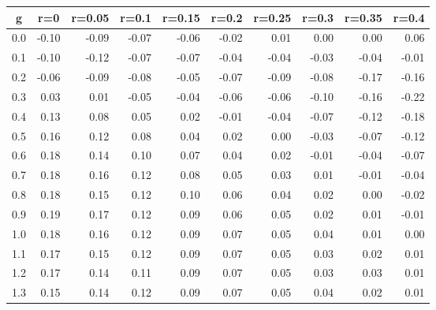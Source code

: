 %
\begin{table}[!tbp]
 \begin{center}
 \begin{tabular}{rrrrrrrrrr}\hline\hline
\multicolumn{1}{c}{g}&\multicolumn{1}{c}{r=0}&\multicolumn{1}{c}{r=0.05}&\multicolumn{1}{c}{r=0.1}&\multicolumn{1}{c}{r=0.15}&\multicolumn{1}{c}{r=0.2}&\multicolumn{1}{c}{r=0.25}&\multicolumn{1}{c}{r=0.3}&\multicolumn{1}{c}{r=0.35}&\multicolumn{1}{c}{r=0.4}\tabularnewline
\hline
0.0&-0.10&-0.09&-0.07&-0.06&-0.02& 0.01& 0.00& 0.00& 0.06\tabularnewline
0.1&-0.10&-0.12&-0.07&-0.07&-0.04&-0.04&-0.03&-0.04&-0.01\tabularnewline
0.2&-0.06&-0.09&-0.08&-0.05&-0.07&-0.09&-0.08&-0.17&-0.16\tabularnewline
0.3& 0.03& 0.01&-0.05&-0.04&-0.06&-0.06&-0.10&-0.16&-0.22\tabularnewline
0.4& 0.13& 0.08& 0.05& 0.02&-0.01&-0.04&-0.07&-0.12&-0.18\tabularnewline
0.5& 0.16& 0.12& 0.08& 0.04& 0.02& 0.00&-0.03&-0.07&-0.12\tabularnewline
0.6& 0.18& 0.14& 0.10& 0.07& 0.04& 0.02&-0.01&-0.04&-0.07\tabularnewline
0.7& 0.18& 0.16& 0.12& 0.08& 0.05& 0.03& 0.01&-0.01&-0.04\tabularnewline
0.8& 0.18& 0.15& 0.12& 0.10& 0.06& 0.04& 0.02& 0.00&-0.02\tabularnewline
0.9& 0.19& 0.17& 0.12& 0.09& 0.06& 0.05& 0.02& 0.01&-0.01\tabularnewline
1.0& 0.18& 0.16& 0.12& 0.09& 0.07& 0.05& 0.04& 0.01& 0.00\tabularnewline
1.1& 0.17& 0.15& 0.12& 0.09& 0.07& 0.05& 0.03& 0.02& 0.01\tabularnewline
1.2& 0.17& 0.14& 0.11& 0.09& 0.07& 0.05& 0.03& 0.03& 0.01\tabularnewline
1.3& 0.15& 0.14& 0.12& 0.09& 0.07& 0.05& 0.04& 0.02& 0.01\tabularnewline
\hline
\end{tabular}

\end{center}

\end{table}


